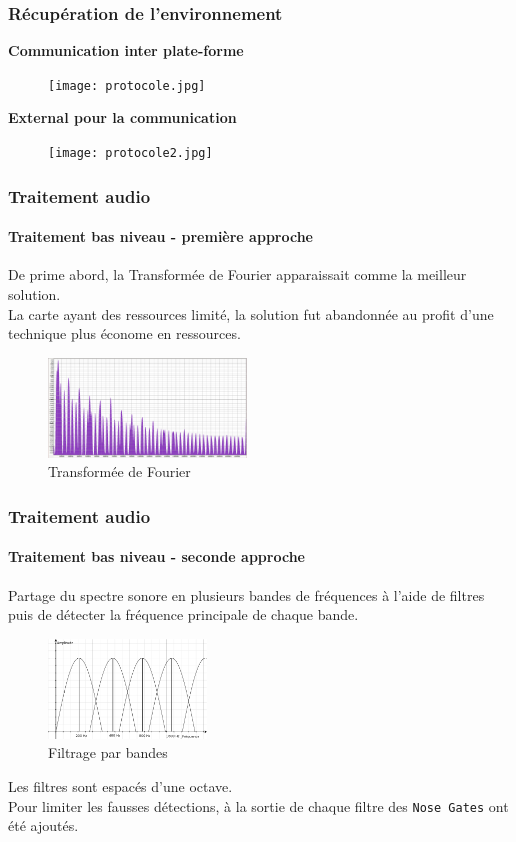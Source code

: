 \documentclass{beamer}
\begin{document}
\begin{frame}
\frametitle{Récupération de l'environnement}

\textbf{Communication inter plate-forme}
\begin{figure}
\centering
\texttt{[image: protocole.jpg]}
\end{figure}
\textbf{External pour la communication}
\begin{figure}
\centering
\texttt{[image: protocole2.jpg]}
\end{figure}
\end{frame}

\begin{frame}
\frametitle{Traitement audio}
\framesubtitle{Traitement bas niveau - première approche}
De prime abord, la Transformée de Fourier apparaissait comme la meilleur solution.\\
La carte ayant des ressources limité, la solution fut abandonnée au profit d'une technique plus économe en ressources.

\begin{figure}
\centering
\includegraphics[height=100px]{fft.jpg}
\caption{Transformée de Fourier}
\end{figure}
\end{frame}


\begin{frame}
\frametitle{Traitement audio}
\framesubtitle{Traitement bas niveau - seconde approche}

Partage du spectre sonore en plusieurs bandes de fréquences à l'aide de filtres puis de détecter la fréquence principale de chaque bande.
\begin{figure}
\centering
\includegraphics[height=100px]{filtre.jpg}
\caption{Filtrage par bandes}
\end{figure}
Les filtres sont espacés d'une octave.\\
Pour limiter les fausses détections, à la sortie de chaque filtre des \texttt{Nose Gates} ont été ajoutés. 
\end{frame}
\end{document}
